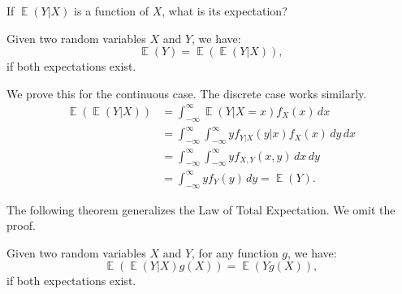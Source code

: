 \documentclass{huhtakm-template-book-v2}
\DeclareMathOperator{\E}{\mathbb{E}}
\begin{document}
    If $\E(Y | X)$ is a function of $X$, what is its expectation?
    \begin{thm}
        Given two random variables $X$ and $Y$, we have:
        \begin{equation*}
            \E(Y) = \E(\E(Y | X)),
        \end{equation*}
        if both expectations exist. 
    \end{thm}
    \begin{proofing}
        We prove this for the continuous case. The discrete case works similarly.
        \begin{align*}
            \E(\E(Y | X)) &= \int_{-\infty}^{\infty} \E(Y | X = x) f_{X}(x) \, dx \\
            &= \int_{-\infty}^{\infty} \int_{-\infty}^{\infty} y f_{Y|X}(y | x) f_{X}(x) \, dy \, dx \\
            &= \int_{-\infty}^{\infty} \int_{-\infty}^{\infty} y f_{X,Y}(x, y) \, dx \, dy \\
            &= \int_{-\infty}^{\infty} y f_{Y}(y) \, dy = \E(Y).
        \end{align*}
    \end{proofing}
    The following theorem generalizes the Law of Total Expectation. We omit the proof.
    \begin{lem}
        \label{Chapter 1 (Lemma) Generalization of Law of total expectation}
        Given two random variables $X$ and $Y$, for any function $g$, we have:
        \begin{equation*}
            \E(\E(Y | X) g(X)) = \E(Y g(X)),
        \end{equation*}
        if both expectations exist.
    \end{lem}
    \newpage
\end{document}
